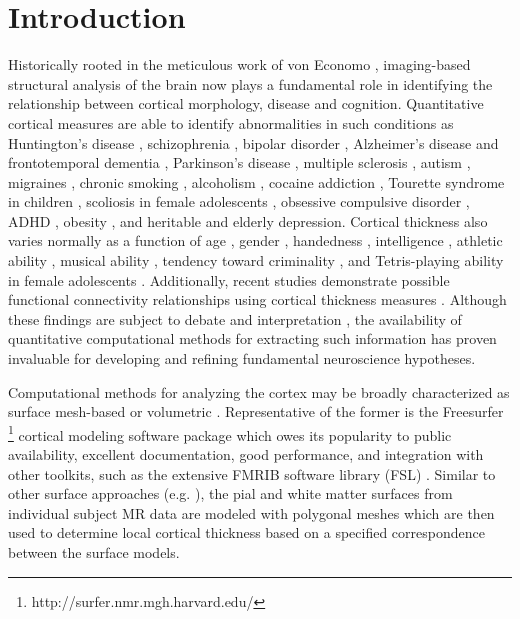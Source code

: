 \section{Introduction}

Historically rooted in the meticulous work of von Economo \citep{economo2008},
imaging-based structural analysis of the brain now plays a fundamental role
in identifying the relationship between cortical morphology, disease and cognition.
Quantitative cortical measures are able to identify abnormalities in such conditions as 
Huntington's disease \citep{rosas2002,rosas2005,selemon2004}, 
schizophrenia \citep{nesvag2008}, bipolar disorder \cite{lyoo2006}, Alzheimer's disease and frontotemporal
dementia \citep{du2007,dickerson2009}, Parkinson's disease \citep{jubault2011},
multiple sclerosis \citep{ramasamy2009}, autism \citep{chung2005,hardan2006},
migraines \citep{dasilva2007}, chronic smoking \citep{kuhn2010}, alcoholism \citep{fortier2011},
cocaine addiction \citep{makris2008}, Tourette syndrome in children \citep{sowell2008},
scoliosis in
female adolescents \citep{wang2012}, obsessive compulsive
disorder \citep{shin2007}, ADHD \citep{almeida-montes2012}, obesity \citep{raji2010}, and heritable \citep{peterson2009}
and elderly \citep{ballmaier2004} depression.  Cortical thickness also
varies normally as a function of age \citep{kochunov2011},
gender \citep{luders2006a}, handedness
\citep{luders2006,amunts2007}, intelligence \citep{shaw2006}, athletic
ability \citep{wei2011}, musical ability \citep{bermudez2009,foster2010}, 
tendency toward criminality \citep{raine2011}, and Tetris-playing
ability in female adolescents \citep{haier2009}.  Additionally,
recent studies demonstrate possible functional 
connectivity relationships using cortical thickness measures
\cite{worsley2005,lerch2006,he2007}.
Although these findings
are subject to debate and interpretation \citep{gernsbacher2007}, 
the availability of quantitative
computational methods for extracting such information
has proven invaluable for developing and refining fundamental 
neuroscience hypotheses.

Computational methods for analyzing the cortex may be 
broadly characterized as surface mesh-based or volumetric \citep{scott2009,clarkson2011}.  Representative of the former is the
Freesurfer%
\footnote{
http://surfer.nmr.mgh.harvard.edu/
}
cortical modeling software package \citep{dale1999,fischl1999,fischl2000,fischl2002,fischl2004}
which owes its popularity to public availability, excellent documentation, 
good performance, and  integration with other toolkits, such as the extensive FMRIB software 
library (FSL) \citep{smith2004}.  Similar to other surface
approaches (e.g. \cite{davatzikos1996,magnotta1999,macdonald2000,kim2005}), the pial
and white matter surfaces from individual subject MR data are modeled with polygonal meshes  
which are then used to determine local cortical thickness based on a specified correspondence between 
the surface models.

